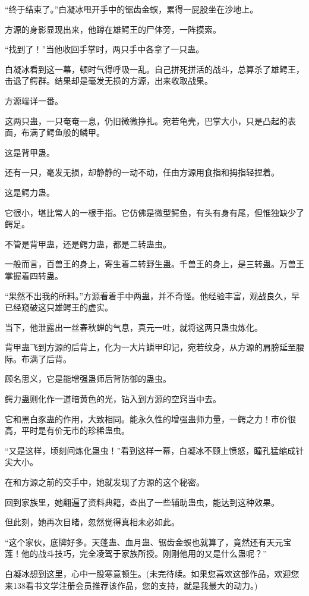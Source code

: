 \begin{this_body}
“终于结束了。”白凝冰甩开手中的锯齿金蜈，累得一屁股坐在沙地上。

方源的身影显现出来，他蹲在雄鳄王的尸体旁，一阵摸索。

“找到了！”当他收回手掌时，两只手中各拿了一只蛊。

白凝冰看到这一幕，顿时气得呼吸一乱。自己拼死拼活的战斗，总算杀了雄鳄王，击退了鳄群。结果却是毫发无损的方源，出来收取战果。

方源端详一番。

这两只蛊，一只奄奄一息，仍旧微微挣扎。宛若龟壳，巴掌大小，只是凸起的表面，布满了鳄鱼般的鳞甲。

这是背甲蛊。

还有一只，毫发无损，却静静的一动不动，任由方源用食指和拇指轻捏着。

这是鳄力蛊。

它很小，堪比常人的一根手指。它仿佛是微型鳄鱼，有头有身有尾，但惟独缺少了鳄足。

不管是背甲蛊，还是鳄力蛊，都是二转蛊虫。

一般而言，百兽王的身上，寄生着二转野生蛊。千兽王的身上，是三转蛊。万兽王掌握着四转蛊。

“果然不出我的所料。”方源看着手中两蛊，并不奇怪。他经验丰富，观战良久，早已经窥破这只雄鳄王的虚实。

当下，他泄露出一丝春秋蝉的气息，真元一吐，就将这两只蛊虫炼化。

背甲蛊飞到方源的后背上，化为一大片鳞甲印记，宛若纹身，从方源的肩膀延至腰际。布满了后背。

顾名思义，它是能增强蛊师后背防御的蛊虫。

鳄力蛊则化作一道暗黄色的光，钻入到方源的空窍当中去。

它和黑白豕蛊的作用，大致相同。能永久性的增强蛊师力量，一鳄之力！市价很高，平时是有价无市的珍稀蛊虫。

“又是这样，顷刻间炼化蛊虫！”看到这样一幕，白凝冰不顾上愤怒，瞳孔猛缩成针尖大小。

在和方源之前的交手中，她就发现了方源的这个秘密。

回到家族里，她翻遍了资料典籍，查出了一些辅助蛊虫，能达到这种效果。

但此刻，她再次目睹，忽然觉得真相未必如此。

“这个家伙，底牌好多。天蓬蛊、血月蛊、锯齿金蜈也就算了，竟然还有天元宝莲！他的战斗技巧，完全凌驾于家族所授。刚刚他用的又是什么蛊呢？”

白凝冰想到这里，心中一股寒意顿生。(未完待续。如果您喜欢这部作品，欢迎您来138看书文学注册会员推荐该作品，您的支持，就是我最大的动力。)

\end{this_body}

